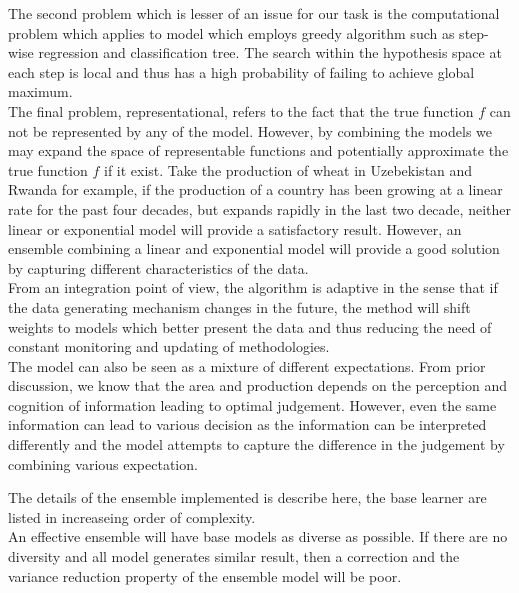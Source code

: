 \documentclass[nojss]{jss}\usepackage[]{graphicx}\usepackage[]{color}
\begin{document}
The second problem which is lesser of an issue for our task is the
computational problem which applies to model which employs greedy
algorithm such as step-wise regression and classification tree. The
search within the hypothesis space at each step is local and thus has
a high probability of failing to achieve global maximum.\\

The final problem, representational, refers to the fact that the true
function $f$ can not be represented by any of the model. However, by
combining the models we may expand the space of representable
functions and potentially approximate the true function $f$ if it
exist. Take the production of wheat in Uzebekistan and Rwanda for
example, if the production of a country has been growing at a linear
rate for the past four decades, but expands rapidly in the last two
decade, neither linear or exponential model will provide a
satisfactory result. However, an ensemble combining a linear and
exponential model will provide a good solution by capturing different
characteristics of the data.\\

From an integration point of view, the algorithm is adaptive in the
sense that if the data generating mechanism changes in the future, the
method will shift weights to models which better present the data and
thus reducing the need of constant monitoring and updating of
methodologies.\\

The model can also be seen as a mixture of different
expectations. From prior discussion, we know that the area and
production depends on the perception and cognition of information
leading to optimal judgement. However, even the same information can
lead to various decision as the information can be interpreted
differently and the model attempts to capture the difference in the
judgement by combining various expectation.\\



\FloatBarrier


The details of the ensemble implemented is describe here, the base
learner are listed in increaseing order of complexity.\\

An effective ensemble will have base models as diverse as possible. If
there are no diversity and all model generates similar result, then a
correction and the variance reduction property of the ensemble model
will be poor.\\
\end{document}
